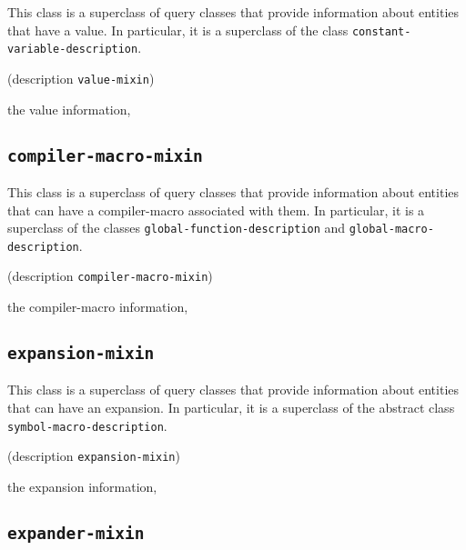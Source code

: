 {\footnotesize
{}
}

This class is a superclass of query classes that provide information
about entities that have a value.  In particular, it is a superclass
of the class \texttt{constant-variable-description}.

{\footnotesize
{}
}

{\footnotesize
{} {(description {\tt value-mixin})}
}

 the value information, 

\subsection{\texttt{compiler-macro-mixin}}
\label{sec-compiler-macro-mixin}

{\footnotesize
{}
}

This class is a superclass of query classes that provide information
about entities that can have a compiler-macro associated with them.
In particular, it is a superclass of the classes
\texttt{global-function-description} and
\texttt{global-macro-description}.

{\footnotesize
{}
}

{\footnotesize
{} {(description {\tt compiler-macro-mixin})}
}

 the compiler-macro information, 

\subsection{\texttt{expansion-mixin}}
\label{sec-expansion-mixin}

{\footnotesize
{}
}

This class is a superclass of query classes that provide information
about entities that can have an expansion.  In particular, it is a
superclass of the abstract class \texttt{symbol-macro-description}.

{\footnotesize
{}
}

{\footnotesize
{} {(description {\tt expansion-mixin})}
}

 the expansion information, 

\subsection{\texttt{expander-mixin}}
\label{sec-expander-mixin}

